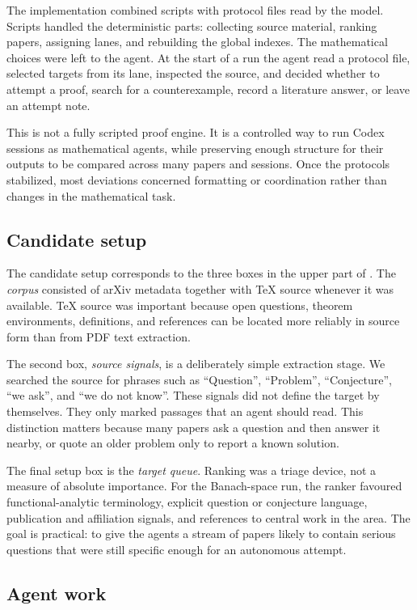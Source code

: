 \documentclass[11pt,reqno]{amsart}
\theoremstyle{plain}
\theoremstyle{definition}
\begin{document}
The implementation combined scripts with protocol files read by the model. Scripts handled the deterministic parts: collecting source material, ranking papers, assigning lanes, and rebuilding the global indexes. The mathematical choices were left to the agent. At the start of a run the agent read a protocol file, selected targets from its lane, inspected the source, and decided whether to attempt a proof, search for a counterexample, record a literature answer, or leave an attempt note.

This is not a fully scripted proof engine. It is a controlled way to run Codex sessions as mathematical agents, while preserving enough structure for their outputs to be compared across many papers and sessions. Once the protocols stabilized, most deviations concerned formatting or coordination rather than changes in the mathematical task.

\subsection{Candidate setup}

The candidate setup corresponds to the three boxes in the upper part of .  The \emph{corpus} consisted of arXiv metadata together with TeX source whenever it was available.  TeX source was important because open questions, theorem environments, definitions, and references can be located more reliably in source form than from PDF text extraction. 

The second box, \emph{source signals}, is a deliberately simple extraction stage. We searched the source for phrases such as ``Question'', ``Problem'', ``Conjecture'', ``we ask'', and ``we do not know''.  These signals did not define the target by themselves.  They only marked passages that an agent should read.  This distinction matters because many papers ask a question and
then answer it nearby, or quote an older problem only to report a known solution.

The final setup box is the \emph{target queue}. Ranking was a triage device, not a measure of absolute importance.  For the Banach-space run, the ranker favoured functional-analytic terminology, explicit question or conjecture language, publication and affiliation signals, and references to central work in the area.  The goal is practical: to give the agents a stream of papers likely to contain serious questions that were still specific enough for an autonomous attempt.

\subsection{Agent work}
\end{document}
